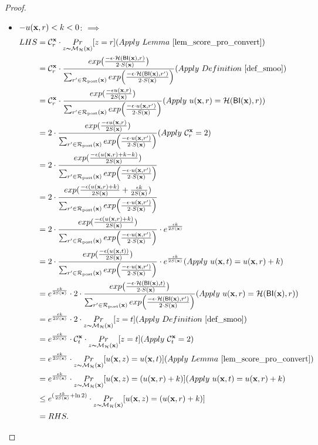 \documentclass{article}
\begin{document}
\begin{proof}
\begin{itemize}
\begin{itemize}
    \item $-u(\textbf{x}, {r}) < k < 0$: $\implies$
      \begin{equation*}
      \begin{split}
      LHS 
      & = \cardinality{\dataobs}{r} \cdot \hexpmechPr{\dataobs}{z = r}     (Apply\ Lemma\ \ref{lem_score_pro_convert})\\
      & = \cardinality{\dataobs}{r} \cdot \frac {exp\big(\frac{-\epsilon\cdot\hellinger(\bysinfer(\dataobs),r)}{2\cdot S(\dataobs)}\big)}{\nomalizer{\dataobs}} 
      (Apply\ Definition\ \ref{def_smoo})\\
      & = \cardinality{\dataobs}{r} \cdot \frac{exp(\frac{-\epsilon \ux{r}}{2 S(\dataobs)})}{\unomalizer{\dataobs}}
      (Apply\ \ux{r} = \hellinger(\bysinfer(\dataobs), r))\\
      & = 2 \cdot \frac{exp(\frac{-\epsilon \ux{r}}{2 S(\dataobs)})}{\unomalizer{\dataobs}}                  (Apply\ \cardinality{\dataobs}{r} = 2)\\
      & = 2 \cdot \frac{exp(\frac{-\epsilon (\ux{r} + k - k)}{2 S(\dataobs)})}{\unomalizer{\dataobs}}\\
      & = 2 \cdot \frac{exp(\frac{-\epsilon (\ux{r} + k)}{2 S(\dataobs)} + \frac{\epsilon k}{2 S(\dataobs)})}{\unomalizer{\dataobs}}\\
      & = 2 \cdot \frac{exp(\frac{-\epsilon (\ux{r} + k)}{2 S(\dataobs)})}{\unomalizer{\dataobs}} \cdot e^{\frac{\epsilon k}{2 S(\dataobs)}}\\
      & = 2 \cdot \frac{exp(\frac{-\epsilon (\ux{t})}{2 S(\dataobs)})}{\unomalizer{\dataobs}} \cdot e^{\frac{\epsilon k}{2 S(\dataobs)}}  (Apply \ \ux{t} = \ux{r} + k)\\
      & = e^{\frac{\epsilon k}{2 S(\dataobs)}} \cdot 2 \cdot \frac {exp\big(\frac{-\epsilon\cdot\hellinger(\bysinfer(\dataobs), t)}{2\cdot S(\dataobs)}\big)}{\nomalizer{\dataobs}} 
      (Apply\ \ux{r} = \hellinger(\bysinfer(\dataobs), r))\\
      & = e^{\frac{\epsilon k}{2 S(\dataobs)}} \cdot 2 \cdot \hexpmechPr{\dataobs}{z = t}       (Apply\ Definition\ \ref{def_smoo})\\
      & = e^{\frac{\epsilon k}{2 S(\dataobs)}} \cdot \cardinality{\dataobs}{t} \cdot \hexpmechPr{\dataobs}{z = t}         (Apply \ \cardinality{\dataobs}{t} = 2)\\
      & = e^{\frac{\epsilon k}{2 S(\dataobs)}} \cdot \hexpmechPr{\dataobs}{\ux{z} = \ux{t}}               (Apply \ Lemma\ \ref{lem_score_pro_convert})\\
      & = e^{\frac{\epsilon k}{2 S(\dataobs)}} \cdot \hexpmechPr{\dataobs}{\ux{z} = (\ux{r} + k)}         (Apply \ \ux{t} = \ux{r} + k)\\
      & \leq e^{(\frac{\epsilon k}{2 S(\dataobs)} + \ln 2)} \cdot \hexpmechPr{\dataobs}{\ux{z} = (\ux{r} + k)}\\
      & = RHS.
      \end{split}
      \end{equation*}


\end{itemize}
\end{itemize}
\end{proof}
\end{document}
